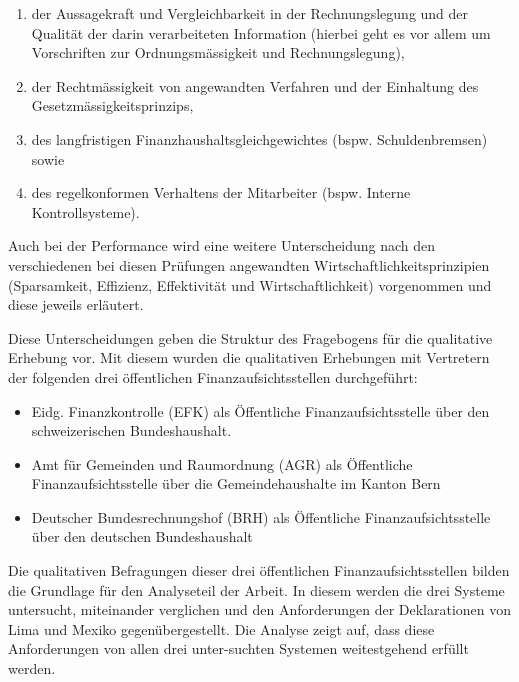 \documentclass[10pt]{article}
\begin{document}
\begin{enumerate}
    \item der Aussagekraft und Vergleichbarkeit in der Rechnungslegung und der Qualität der darin verarbeiteten Information (hierbei geht es vor allem um Vorschriften zur Ordnungsmässigkeit und Rechnungslegung),

    \item der Rechtmässigkeit von angewandten Verfahren und der Einhaltung des Gesetzmässigkeitsprinzips,

    \item des langfristigen Finanzhaushaltsgleichgewichtes (bspw. Schuldenbremsen) sowie

    \item des regelkonformen Verhaltens der Mitarbeiter (bspw. Interne Kontrollsysteme). 

\end{enumerate}

Auch bei der Performance wird eine weitere Unterscheidung nach den verschiedenen bei diesen Prüfungen angewandten Wirtschaftlichkeitsprinzipien (Sparsamkeit, Effizienz, Effektivität und Wirtschaftlichkeit) vorgenommen und diese jeweils erläutert.

Diese Unterscheidungen geben die Struktur des Fragebogens für die qualitative Erhebung vor. Mit diesem wurden die qualitativen Erhebungen mit Vertretern der folgenden drei öffentlichen Finanzaufsichtsstellen durchgeführt: 

\begin{itemize}
    \item Eidg. Finanzkontrolle (EFK) als Öffentliche Finanzaufsichtsstelle über den schweizerischen Bundeshaushalt.

    \item Amt für Gemeinden und Raumordnung (AGR) als Öffentliche Finanzaufsichtsstelle über die Gemeindehaushalte im Kanton Bern

    \item Deutscher Bundesrechnungshof (BRH) als Öffentliche Finanzaufsichtsstelle über den deutschen Bundeshaushalt

\end{itemize}

Die qualitativen Befragungen dieser drei öffentlichen Finanzaufsichtsstellen bilden die Grundlage für den Analyseteil der Arbeit. In diesem werden die drei Systeme untersucht, miteinander verglichen und den Anforderungen der Deklarationen von Lima und Mexiko gegenübergestellt. Die Analyse zeigt auf, dass diese Anforderungen von allen drei unter-suchten Systemen weitestgehend erfüllt werden.
\end{document}
